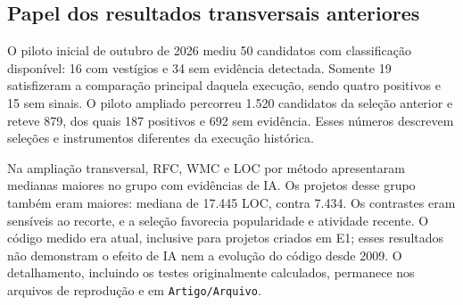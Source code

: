 

\subsection{Papel dos resultados transversais anteriores}

O piloto inicial de outubro de 2026 mediu 50 candidatos com classificação disponível: 16 com vestígios e 34 sem evidência detectada. Somente 19 satisfizeram a comparação principal daquela execução, sendo quatro positivos e 15 sem sinais. O piloto ampliado percorreu 1.520 candidatos da seleção anterior e reteve 879, dos quais 187 positivos e 692 sem evidência. Esses números descrevem seleções e instrumentos diferentes da execução histórica.

Na ampliação transversal, RFC, WMC e LOC por método apresentaram medianas maiores no grupo com evidências de IA. Os projetos desse grupo também eram maiores: mediana de 17.445 LOC, contra 7.434. Os contrastes eram sensíveis ao recorte, e a seleção favorecia popularidade e atividade recente. O código medido era atual, inclusive para projetos criados em E1; esses resultados não demonstram o efeito de IA nem a evolução do código desde 2009. O detalhamento, incluindo os testes originalmente calculados, permanece nos arquivos de reprodução e em \texttt{Artigo/Arquivo}.
